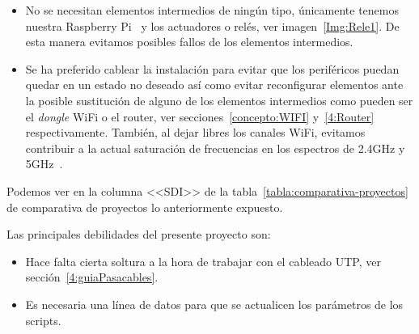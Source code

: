\begin{itemize}
\item
    No se necesitan elementos intermedios de ningún tipo, únicamente tenemos nuestra Raspberry Pi~\cite{misc:RbPWeb} y los actuadores o relés, ver imagen~\ref{Img:Rele1}. De esta manera evitamos posibles fallos de los elementos intermedios.

    
\item
    Se ha preferido cablear la instalación para evitar que los periféricos puedan quedar en un estado no deseado así como evitar reconfigurar elementos ante la posible sustitución de alguno de los elementos intermedios como pueden ser el \textit{dongle} WiFi o el router, ver secciones~\ref{concepto:WIFI} y~\ref{4:Router} respectivamente.
    También, al dejar libres los canales WiFi, evitamos contribuir a la actual saturación de frecuencias en los espectros de 2.4GHz y 5GHz~\cite{manual:IEEE802.11}.

\end{itemize}


Podemos ver en la columna <<SDI>> de la tabla~\ref{tabla:comparativa-proyectos} de comparativa de proyectos lo anteriormente expuesto.



Las principales debilidades del presente proyecto son:

\begin{itemize}
\tightlist
\item Hace falta cierta soltura a la hora de trabajar con el cableado UTP, ver sección~\ref{4:guiaPasacables}.
\item Es necesaria una línea de datos para que se actualicen los parámetros de los scripts.

\end{itemize}

